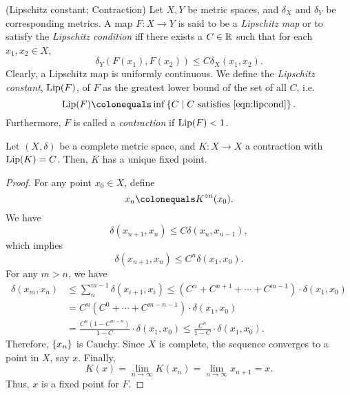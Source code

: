 \documentclass[12pt,twoside,draft]{book}
\begin{document}
\begin{definition}
  (Lipschitz constant; Contraction)
  Let $X, Y$ be metric spaces, and $\delta_X$ and $\delta_Y$ be corresponding metrics.
  A map $F: X \to Y$ is said to be a \textit{Lipschitz map} or to satisfy the \textit{Lipschitz condition} iff there exists a $C \in \mathbb{R}$ such that for each $x_1, x_2 \in X$,
  \begin{equation}
    \delta_Y(F(x_1),F(x_2)) \leq C \delta_X(x_1, x_2). 
    \label{eqn:lipcond}
  \end{equation}
  Clearly, a Lipschitz map is uniformly continuous.
  We define the \textit{Lipschitz constant}, $\mathrm{Lip}(F)$, of $F$ as the greatest lower bound of the set of all $C$, i.e.
  \begin{equation*}
    \Lip(F) \ceq \inf\setst{C}{C \mbox{ satisfies } \eqref{eqn:lipcond}}.
  \end{equation*}
  Furthermore, $F$ is called a \textit{contraction} if $\mathrm{Lip}(F) < 1$.
\end{definition}

\begin{theorem}
  Let $(X,\delta)$ be a complete metric space, and $K: X \to X$ a contraction with $\mathrm{Lip}(K) = C$.
  Then, $K$ has a unique fixed point.
  \label{thm:cfp}
  \begin{proof}
    For any point $x_0 \in X$, define
    \begin{equation*}
      x_n \ceq \itr{K}{n}(x_0).
    \end{equation*}
    We have
    \begin{equation*}
      \delta(x_{n+1}, x_n) \leq C \delta(x_n, x_{n-1}),
    \end{equation*}
    which implies
    \begin{equation*}
      \delta(x_{n+1}, x_n) \leq C^n \delta(x_1, x_0).
    \end{equation*}
    For any $m > n$, we have
    \begin{align*}
      \delta(x_m, x_n) &\leq \sum\limits_n^{m-1} \delta(x_{i+1}, x_i) 
        \leq (C^n + C^{n+1} + \cdots + C^{m-1}) \cdot \delta(x_1, x_0) \\
        & = C^n (C^{0} + \cdots + C^{m-n-1} ) \cdot \delta(x_1, x_0) \\
        & = \frac{C^n(1 - C^{m-n})}{1-C} \cdot \delta(x_1, x_0)
        \leq \frac{C^n}{1-C} \cdot \delta(x_1, x_0).
    \end{align*}
    Therefore, $\left \{ x_n \right \}$ is Cauchy.
    Since $X$ is complete, the sequence converges to a point in $X$, say $x$.
    Finally, 
    \begin{equation*}
      K(x) = \lim\limits_{n\to \infty} K(x_n) = \lim\limits_{n\to \infty} x_{n+1} = x.
    \end{equation*}
    Thus, $x$ is a fixed point for $F$.
  \end{proof}
\end{theorem}
\end{document}
